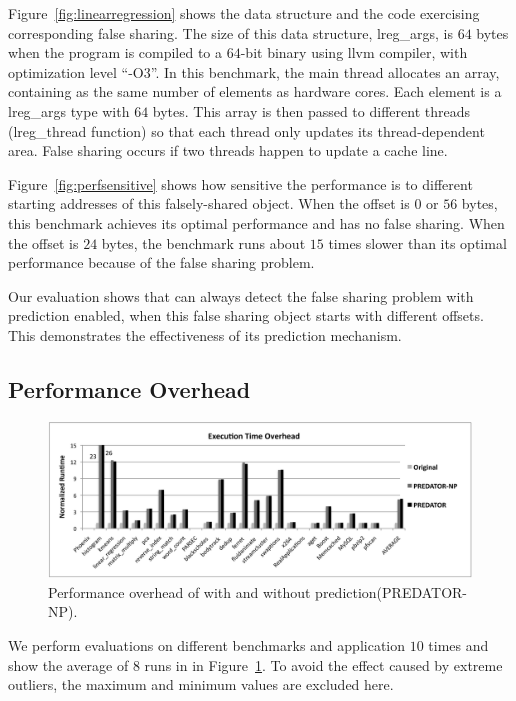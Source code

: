 Figure~\ref{fig:linearregression} shows the data structure and the code exercising corresponding false sharing. The size of this data structure, lreg\_args, is $64$ bytes 
when the program is compiled to a $64$-bit binary using llvm compiler, with optimization level ``-O3''. In this benchmark, the main thread allocates an array, containing as the same number of elements as hardware cores. Each element is a lreg\_args type with $64$ bytes. This array is then passed to different threads (lreg\_thread function) so that each thread only updates its thread-dependent area. False sharing occurs if two threads happen to update a cache line. 

Figure~\ref{fig:perfsensitive} shows how sensitive the performance is to different starting addresses of this falsely-shared object. When the offset is $0$ or $56$ bytes, this benchmark achieves its optimal performance and has no false sharing. When the offset is $24$ bytes, the benchmark runs about $15$ times slower than its optimal performance because of the false sharing problem.

Our evaluation shows that \Predator{} can always detect the false sharing problem with prediction enabled, when this false  sharing object starts with different offsets. This demonstrates the effectiveness of its prediction mechanism.

\subsection{Performance Overhead}
\label{sec:perfoverhead}

\begin{figure}[!t]
\centering
\includegraphics[width=6in]{predator/figure/perf}
\caption{
Performance overhead of \Predator{} with and without prediction(PREDATOR-NP).
\label{fig:perf}}
\end{figure}
We perform evaluations on different benchmarks and application $10$ times and show the average of $8$ runs in in Figure~\ref{fig:perf}. To avoid the effect caused by extreme outliers, the maximum and minimum values are excluded here. 

